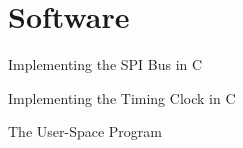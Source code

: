 \chapter{Software}

Implementing the SPI Bus in C

Implementing the Timing Clock in C

The User-Space Program